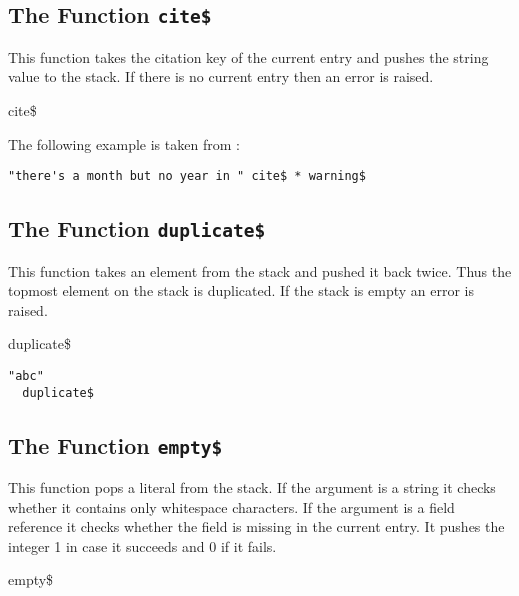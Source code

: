\subsection{The Function \texttt{cite\$}}%

This function takes the citation key of the current entry and pushes
the string value to the stack. If there is no current entry then an
error is raised.

\begin{BstFunction}{cite\$}
\end{BstFunction}

The following example is taken from :

\begin{lstlisting}[language=bst]
  "there's a month but no year in " cite$ * warning$
\end{lstlisting}


\subsection{The Function \texttt{duplicate\$}}%

This function takes an element from the stack and pushed it back
twice. Thus the topmost element on the stack is duplicated. If the
stack is empty an error is raised.

\begin{BstFunction}{duplicate\$}
\end{BstFunction}

\begin{lstlisting}[language=bst]
  "abc"
  duplicate$
\end{lstlisting}

\subsection{The Function \texttt{empty\$}}%

This function pops a literal from the stack. If the argument is a
string it checks whether it contains only whitespace characters. If
the argument is a field reference it checks whether the field is
missing in the current entry. It pushes the integer 1 in case it
succeeds and 0 if it fails.

\INCOMPLETE

\begin{BstFunction}{empty\$}
\end{BstFunction}

